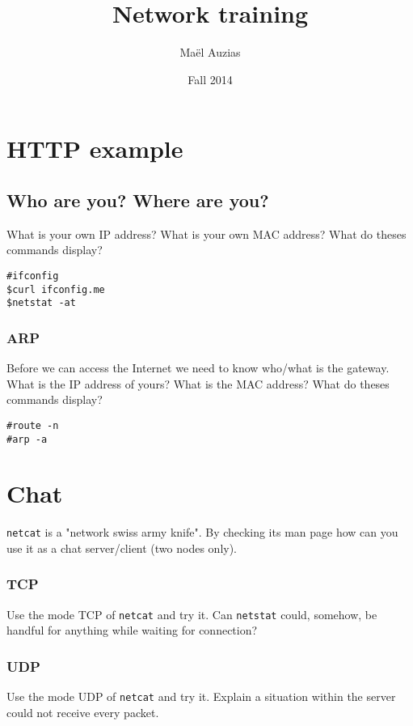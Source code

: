 \documentclass[11pt]{article}
\begin{document}
\title{Network training}
\date{Fall 2014}
\author{Maël Auzias}
\maketitle

\tableofcontents
\pagebreak


\section{HTTP example}
\subsection{Who are you? Where are you?}
What is your own IP address? What is your own MAC address? What do theses commands display?
\begin{verbatim}
#ifconfig
$curl ifconfig.me
$netstat -at
\end{verbatim}

\subsubsection{ARP}
Before we can access the Internet we need to know who/what is the gateway. What is the IP address of yours? What is the MAC address? What do theses commands display?
\begin{verbatim}
#route -n
#arp -a
\end{verbatim}

\section{Chat}
\verb"netcat" is a "network swiss army knife". By checking its man page how can you use it as a chat server/client (two nodes only).
\subsubsection{TCP}
Use the mode TCP of \verb"netcat" and try it. Can \verb"netstat" could, somehow, be handful for anything while waiting for connection?
\subsubsection{UDP}
Use the mode UDP of \verb"netcat" and try it. Explain a situation within the server could not receive every packet.
\end{document}
